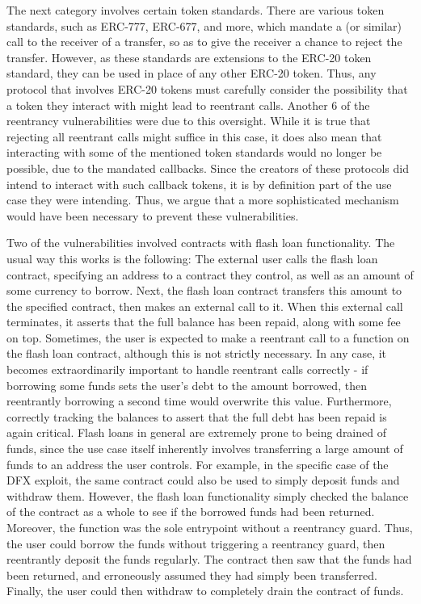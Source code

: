 \par
The next category involves certain token standards. There are various token standards, such as ERC-777, ERC-677, and more, which mandate a  (or similar) call to the receiver of a transfer, so as to give the receiver a chance to reject the transfer. However, as these standards are extensions to the ERC-20 token standard, they can be used in place of any other ERC-20 token. Thus, any protocol that involves ERC-20 tokens must carefully consider the possibility that a token they interact with might lead to reentrant calls. Another 6 of the reentrancy vulnerabilities were due to this oversight. While it is true that rejecting all reentrant calls might suffice in this case, it does also mean that interacting with some of the mentioned token standards would no longer be possible, due to the mandated callbacks. Since the creators of these protocols did intend to interact with such callback tokens, it is by definition part of the use case they were intending. Thus, we argue that a more sophisticated mechanism would have been necessary
to prevent these vulnerabilities.
\par
Two of the vulnerabilities involved contracts with flash loan functionality. The usual way this works is the following: The external user calls the flash loan contract, specifying an address to a contract they control, as well as an amount of some currency to borrow. Next, the flash loan contract transfers this amount to the specified contract, then makes an external call to it. When this external call terminates, it asserts that the full balance has been repaid, along with some fee on top. Sometimes, the user is expected to make a reentrant call to a  function on the flash loan contract, although this is not strictly necessary. In any case, it becomes extraordinarily important to handle reentrant calls correctly - if borrowing some funds sets the user's debt to the amount borrowed, then reentrantly borrowing a second time would overwrite this value. Furthermore, correctly tracking the balances to assert that the full debt has been repaid is again critical. Flash loans in general are extremely prone to being drained of funds, since the use case itself inherently involves transferring a large amount of funds to an address the user controls. For example, in the specific case of the DFX exploit, the same contract could also be used to simply deposit funds and withdraw them. However, the flash loan functionality simply checked the balance of the contract as a whole to see if the borrowed funds had been returned. Moreover, the  function was the sole entrypoint without a reentrancy guard. Thus, the user could borrow the funds without triggering a reentrancy guard, then reentrantly deposit the funds regularly. The contract then saw that the funds had been returned, and erroneously assumed they had simply been transferred. Finally, the user could then withdraw to completely drain the contract of funds.
